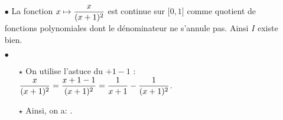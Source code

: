\documentclass[a4paper, 11pt,reqno]{article}
\begin{document}
\begin{correction}
\begin{enumerate}
\begin{itemize}
			      \item[$\bullet$] La fonction $x\mapsto \displaystyle\frac{x}{(x+1)^2}$ est continue sur $\lbrack 0,1\rbrack$ comme quotient de fonctions polynomiales dont le d\'enominateur ne s'annule pas. Ainsi $I$ existe bien.
			      \item[$\bullet$]
			            \begin{itemize}
				            \item[$\star$] On utilise l'astuce du $+1-1$ : $\displaystyle\frac{x}{(x+1)^2}=\displaystyle\frac{x+1-1}{(x+1)^2} = \displaystyle\frac{1}{x+1}-\displaystyle\frac{1}{(x+1)^2}$.
				            \item[$\star$] Ainsi, on a: .
			            \end{itemize}
		      \end{itemize}
	\end{enumerate}
\end{correction}
\end{document}
